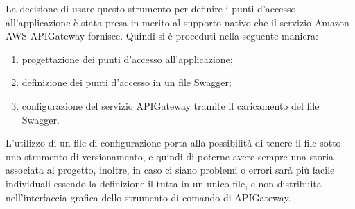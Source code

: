 La decisione di usare questo strumento per definire i punti d'accesso
all'applicazione è stata presa in merito al supporto nativo che il servizio
Amazon AWS APIGateway fornisce. Quindi si è proceduti nella seguente maniera:
\begin{enumerate}
  \item progettazione dei punti d'accesso all'applicazione;
  \item definizione dei punti d'accesso in un file Swagger;
  \item configurazione del servizio APIGateway tramite il caricamento del file
Swagger.
\end{enumerate}


L'utilizzo di un file di configurazione porta alla possibilità di
tenere il file sotto uno strumento di versionamento, e quindi di poterne avere
sempre una storia associata al progetto, inoltre, in caso ci siano problemi o
errori sarà più facile individuali essendo la definizione il tutta in un unico
file, e non distribuita nell'interfaccia grafica dello strumento di comando di
APIGateway.
